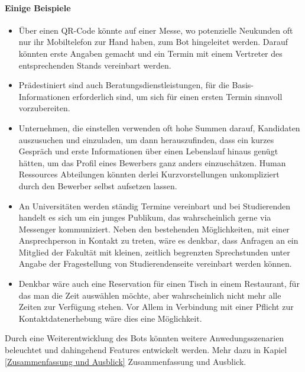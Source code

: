 \paragraph{Einige Beispiele}
\begin{itemize}
    \item Über einen QR-Code könnte auf einer Messe, wo potenzielle Neukunden oft nur ihr Mobiltelefon zur Hand haben, zum Bot hingeleitet werden. Darauf könnten erste Angaben gemacht und ein Termin mit einem Vertreter des entsprechenden Stands vereinbart werden. 
    \item Prädestiniert sind auch Beratungsdienstleistungen, für die Basis-Informationen erforderlich sind, um sich für einen ersten Termin sinnvoll vorzubereiten.
    \item Unternehmen, die einstellen verwenden oft hohe Summen darauf, Kandidaten auszusuchen und einzuladen, um dann herauszufinden, dass ein kurzes Gespräch und erste Informationen über einen Lebenslauf hinaus genügt hätten, um das Profil eines Bewerbers ganz anders einzuschätzen. Human Ressources Abteilungen könnten derlei Kurzvorstellungen unkompliziert durch den Bewerber selbst aufsetzen lassen.
    \item An Universitäten werden ständig Termine vereinbart und bei Studierenden handelt es sich um ein junges Publikum, das wahrscheinlich gerne via Messenger kommuniziert. Neben den bestehenden Möglichkeiten, mit einer Ansprechperson in Kontakt zu treten, wäre es denkbar, dass Anfragen an ein Mitglied der Fakultät mit kleinen, zeitlich begrenzten Sprechstunden unter Angabe der Fragestellung von Studierendenseite vereinbart werden können.
    \item Denkbar wäre auch eine Reservation für einen Tisch in einem Restaurant, für das man die Zeit auswählen möchte, aber wahrscheinlich nicht mehr alle Zeiten zur Verfügung stehen. Vor Allem in Verbindung mit einer Pflicht zur Kontaktdatenerhebung wäre dies eine Möglichkeit.
\end{itemize}

Durch eine Weiterentwicklung des Bots könnten weitere Anwedungsszenarien beleuchtet und dahingehend Features entwickelt werden. Mehr dazu in Kapiel \ref*{Zusammenfassung und Ausblick} Zusammenfassung und Ausblick.